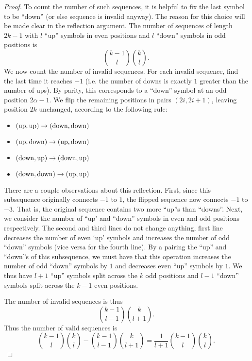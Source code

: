 \begin{proof}
    To count the number of such sequences, it is helpful to fix the last symbol to be ``down'' (or else sequence is invalid anyway). The reason for this choice will be made clear in the reflection argument. The number of sequences of length $2k-1$ with $l$ ``up'' symbols in even positions and $l$ ``down'' symbols in odd positions is \[
    \binom{k-1}{l}\binom{k}{l}.
    \]
    We now count the number of invalid sequences. For each invalid sequence, find the last time it reaches $-1$ (i.e. the number of downs is exactly $1$ greater than the number of ups). By parity, this corresponds to a ``down'' symbol at an odd position $2\alpha-1$. We flip the remaining positions in pairs $(2i,2i+1)$, leaving position $2k$ unchanged, according to the following rule:
    \begin{itemize}
        \item $(\rm{up,up})\to (\rm{down,down})$
        \item $(\rm{up,down})\to (\rm{up,down})$
        \item $(\rm{down,up})\to (\rm{down,up})$
        \item $(\rm{down,down})\to (\rm{up,up})$
    \end{itemize}
    There are a couple observations about this reflection. First, since this subsequence originally connects $-1$ to $1$, the flipped sequence now connects $-1$ to $-3$. That is, the original sequence contains two more ``up''s than ``downs''. Next, we consider the number of ``up' and ``down'' symbols in even and odd positions respectively. The second and third lines do not change anything, first line decreases the number of even `up' symbols and increases the number of odd ``down'' symbols (vice versa for the fourth line). By a pairing the ``up'' and ``down''s of this subsequence, we must have that this operation increases the number of odd ``down'' symbols by $1$ and decreases even ``up'' symbols by $1$. We thus have $l+1$ ``up'' symbols split across the $k$ odd positions and $l-1$ ``down'' symbols split across the $k-1$ even positions. 
    
    The number of invalid sequences is thus \[
        \binom{k-1}{l-1}\binom{k}{l+1}.
    \]
    Thus the number of valid sequences is \[
        \binom{k-1}{l}\binom{k}{l}-\binom{k-1}{l-1}\binom{k}{l+1} = \frac{1}{l+1} \binom{k-1}{l}\binom{k}{l}.
    \]
\end{proof}
